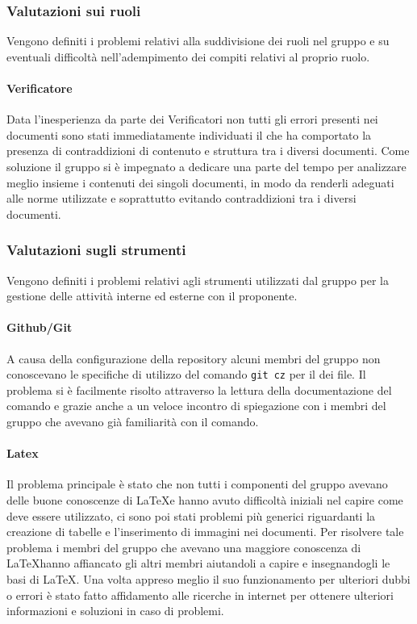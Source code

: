 \documentclass[../piano-di-qualifica.tex]{subfiles}
\begin{document}
\subsubsection{Valutazioni sui ruoli}
\label{sssec:valutazioni_ruoli}
Vengono definiti i problemi relativi alla suddivisione dei ruoli nel gruppo e su eventuali difficoltà nell'adempimento dei compiti relativi al proprio ruolo.
\paragraph{Verificatore}
\label{sub:verificatore}
Data l'inesperienza da parte dei Verificatori non tutti gli errori presenti nei documenti sono stati immediatamente individuati il che ha comportato la presenza di contraddizioni di contenuto e struttura tra i diversi documenti.
Come soluzione il gruppo si è impegnato a dedicare una parte del tempo per analizzare meglio insieme i contenuti dei singoli documenti, in modo da renderli adeguati alle norme utilizzate e soprattutto evitando contraddizioni tra i diversi documenti.

\subsubsection{Valutazioni sugli strumenti}
\label{sssec:valutazioni_strumenti}
Vengono definiti i problemi relativi agli strumenti utilizzati dal gruppo per la gestione delle attività interne ed esterne con il proponente.

\paragraph{Github/Git}
\label{sub:github}
A causa della configurazione della repository alcuni membri del gruppo non conoscevano le specifiche di utilizzo del comando \texttt{git cz} per il  dei file. Il problema si è facilmente risolto attraverso la lettura della documentazione del comando e grazie anche a un veloce incontro di spiegazione con i membri del gruppo che avevano già familiarità con il comando.

\paragraph{Latex}
\label{sub:latex}
Il problema principale è stato che non tutti i componenti del gruppo avevano delle buone conoscenze di \LaTeX e hanno avuto difficoltà iniziali nel capire come deve essere utilizzato, ci sono poi stati problemi più generici riguardanti la creazione di tabelle e l'inserimento di immagini nei documenti.
Per risolvere tale problema i membri del gruppo che avevano una maggiore conoscenza di \LaTeX hanno affiancato gli altri membri aiutandoli a capire e insegnandogli le basi di \LaTeX. Una volta appreso meglio il suo funzionamento per ulteriori dubbi o errori è stato fatto affidamento alle ricerche in internet per ottenere ulteriori informazioni e soluzioni in caso di problemi.
\end{document}
